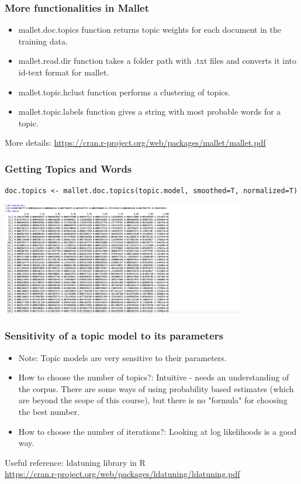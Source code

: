 \documentclass{beamer}
\begin{document}
\begin{frame}
\frametitle{More functionalities in Mallet}
\begin{itemize}
\item mallet.doc.topics function returns topic weights for each document in the training data. 
\item mallet.read.dir function takes a folder path with .txt files and converts it into id-text format for mallet.
\item mallet.topic.hclust function performs a clustering of topics. 
\item mallet.topic.labels function gives a string with most probable words for a topic.
\end{itemize}
\footnotesize More details: \url{https://cran.r-project.org/web/packages/mallet/mallet.pdf}
\end{frame}

\begin{frame}[fragile]
\frametitle{Getting Topics and Words}
\footnotesize
\begin{verbatim}
doc.topics <- mallet.doc.topics(topic.model, smoothed=T, normalized=T)
\end{verbatim}
\includegraphics[width=0.8\textwidth]{doctopics.png}
\end{frame}

\begin{frame}
\frametitle{Sensitivity of a topic model to its parameters}
\begin{itemize}
\item Note: Topic models are very sensitive to their parameters.
\item How to choose the number of topics?: Intuitive - needs an understanding of the corpus. There are some ways of using probability based estimates (which are beyond the scope of this course), but there is no "formula" for choosing the best number. \pause
\item How to choose the number of iterations?: Looking at log likelihoods is a good way. 
\end{itemize}
\footnotesize Useful reference: ldatuning library in R \\ \url{https://cran.r-project.org/web/packages/ldatuning/ldatuning.pdf}
\end{frame}
\end{document}
